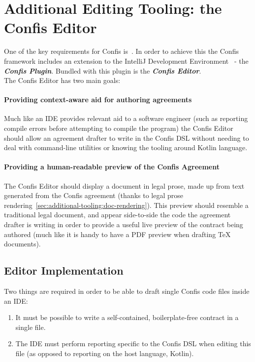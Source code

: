 
\section[The Confis Editor]{Additional Editing Tooling: the Confis Editor}\label{sec:additional-dsl-tooling}

One of the key requirements for Confis is~.
In order to achieve this the Confis framework includes an extension to the IntelliJ Development Environment~\cite{intelliJRepo} - the \textbf{\emph{Confis Plugin}}.
Bundled with this plugin is the \textbf{\emph{Confis Editor}}.\\

The Confis Editor has two main goals:

\paragraph{Providing context-aware aid for authoring agreements} Much like an IDE provides relevant aid to a software engineer (such as reporting compile errors before attempting to compile the program) the Confis Editor should allow an agreement drafter to write in the Confis DSL without needing to deal with command-line utilities or knowing the tooling around Kotlin language.

\paragraph{Providing a human-readable preview of the Confis Agreement}

The Confis Editor should display a document in legal prose, made up from text generated from the Confis agreement (thanks to legal prose rendering~\ref{sec:additional-tooling:doc-rendering}).
This preview should resemble a traditional legal document, and appear side-to-side the code the agreement drafter is writing in order to provide a useful live preview of the contract being authored (much like it is handy to have a PDF preview when drafting TeX documents).

\subsection{Editor Implementation}\label{subsec:editor-implementation}

Two things are required in order to be able to draft single Confis code files inside an IDE:
\begin{enumerate}
    \item It must be possible to write a self-contained, boilerplate-free contract in a single file.
    \item The IDE must perform reporting specific to the Confis DSL when editing this file (as opposed to reporting on the host language, Kotlin).
\end{enumerate}

